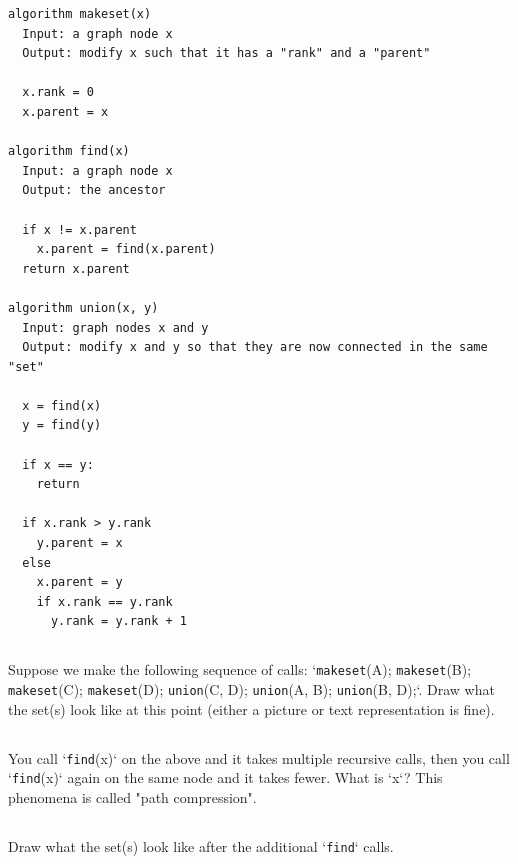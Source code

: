 \documentclass [12pt]{article}
\begin{document}
\begin{verbatim}
algorithm makeset(x)
  Input: a graph node x
  Output: modify x such that it has a "rank" and a "parent"

  x.rank = 0
  x.parent = x

algorithm find(x)
  Input: a graph node x
  Output: the ancestor

  if x != x.parent
    x.parent = find(x.parent)
  return x.parent

algorithm union(x, y)
  Input: graph nodes x and y
  Output: modify x and y so that they are now connected in the same "set"

  x = find(x)
  y = find(y)

  if x == y:
    return

  if x.rank > y.rank
    y.parent = x
  else
    x.parent = y
    if x.rank == y.rank
      y.rank = y.rank + 1
\end{verbatim}


\subsection{}
Suppose we make the following sequence of calls: `\texttt{makeset}(A); \texttt{makeset}(B); \texttt{makeset}(C); \texttt{makeset}(D); \texttt{union}(C, D); \texttt{union}(A, B); \texttt{union}(B, D);`. Draw what the set(s) look like at this point (either a picture or text representation is fine).


\subsection{}
You call `\texttt{find}(x)` on the above and it takes multiple recursive calls, then you call `\texttt{find}(x)` again on the same node and it takes fewer. What is `x`? This phenomena is called "path compression".


\subsection{}
Draw what the set(s) look like after the additional `\texttt{find}` calls. 

\end{document}
